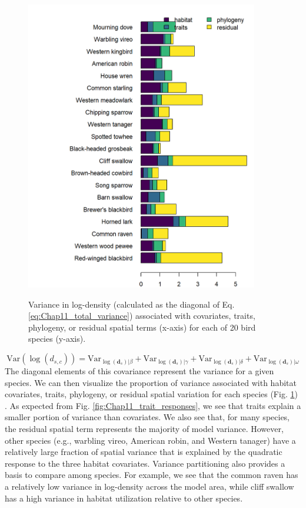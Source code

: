 \begin{figure}[!ht]
    \caption[Variance partitioning for 20 bird species]{Variance in log-density (calculated as the diagonal of Eq. \ref{eq:Chap11_total_variance}) associated with covariates, traits, phylogeny, or residual spatial terms (x-axis) for each of 20 bird species (y-axis).}
    \includegraphics[width=4in]{Chap_11/Variance_partitioning.png}
    \label{fig:Chap11_variance_partitioning}
\end{figure}

\begin{equation} \label{eq:Chap11_total_variance}
  \mathrm{Var}( \log(d_{s,c}) ) = 
  \mathrm{Var}_{\log(\mathbf{d}_{s})|\beta} + 
  \mathrm{Var}_{\log(\mathbf{d}_{s})|\gamma} + 
  \mathrm{Var}_{\log(\mathbf{d}_{s})|\delta} +
  \mathrm{Var}_{\log(\mathbf{d}_{s})|\omega}
\end{equation}
The diagonal elements of this covariance represent the variance for a given species.  We can then visualize the proportion of variance associated with habitat covariates, traits, phylogeny, or residual spatial variation for each species (Fig. \ref{fig:Chap11_variance_partitioning}) \cite{pollock_understanding_2014,ovaskainen_how_2017}.  As expected from Fig. \ref{fig:Chap11_trait_responses}, we see that traits explain a smaller portion of variance than covariates.  We also see that, for many species, the residual spatial term represents the majority of model variance.  However, other species (e.g., warbling vireo, American robin, and Western tanager) have a relatively large fraction of spatial variance that is explained by the quadratic response to the three habitat covariates.  Variance partitioning also provides a basis to compare among species.  For example, we see that the common raven has a relatively low variance in log-density across the model area, while cliff swallow has a high variance in habitat utilization relative to other species.   


